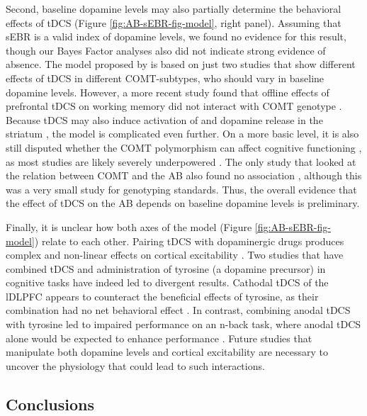 \documentclass[11pt,english,]{memoir}
\begin{document}
Second, baseline dopamine levels may also partially determine the behavioral effects of tDCS \autocite{Wiegand2016} (Figure \ref{fig:AB-sEBR-fig-model}, right panel). Assuming that sEBR is a valid index of dopamine levels, we found no evidence for this result, though our Bayes Factor analyses also did not indicate strong evidence of absence. The model proposed by \textcite{Wiegand2016} is based on just two studies \autocites{Plewnia2013}{Nieratschker2015} that show different effects of tDCS in different COMT-subtypes, who should vary in baseline dopamine levels. However, a more recent study found that offline effects of prefrontal tDCS on working memory did not interact with COMT genotype \autocite{Jongkees2018}. Because tDCS may also induce activation of \autocite{Meyer2019} and dopamine release in the striatum \autocites{Tanaka2013}{Fonteneau2018}, the model is complicated even further. On a more basic level, it is also still disputed whether the COMT polymorphism can affect cognitive functioning \autocite{Barnett2008}, as most studies are likely severely underpowered \autocite{Border2019}. The only study that looked at the relation between COMT and the AB also found no association \autocite{Colzato2011}, although this was a very small study for genotyping standards. Thus, the overall evidence that the effect of tDCS on the AB depends on baseline dopamine levels is preliminary.

Finally, it is unclear how both axes of the model (Figure \ref{fig:AB-sEBR-fig-model}) relate to each other. Pairing tDCS with dopaminergic drugs produces complex and non-linear effects on cortical excitability \autocites{Monte-Silva2009}{Fresnoza2014}. Two studies that have combined tDCS and administration of tyrosine (a dopamine precursor) in cognitive tasks have indeed led to divergent results. Cathodal tDCS of the lDLPFC appears to counteract the beneficial effects of tyrosine, as their combination had no net behavioral effect \autocites{Jongkees2017}{Dennison2018}. In contrast, combining anodal tDCS with tyrosine led to impaired performance on an n-back task, where anodal tDCS alone would be expected to enhance performance \autocite{Jongkees2017}. Future studies that manipulate both dopamine levels and cortical excitability are necessary to uncover the physiology that could lead to such interactions.

\hypertarget{conclusions}{%
\subsection{Conclusions}\label{conclusions}}
\end{document}

